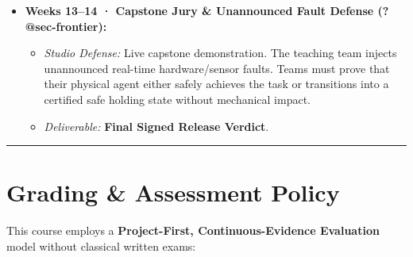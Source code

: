 \documentclass[
  9pt,
  letterpaper,
  open=right,
  numbers=noenddot,
  captions=tableheading]{scrbook}
\makeatletter
\providecommand{\tightlist}{%
  \setlength{\itemsep}{0pt}\setlength{\parskip}{0pt}}
\def\tightlist{}
\let\tightlist\relax
\newif\ifmlsys@inside@longtable
\newif\ifmlsys@longtable@numbered
\let\mlsys@orig@label\label
\renewcommand{\label}[1]{%
  \ifmlsys@inside@longtable
    \global\mlsys@longtable@numberedtrue
  \fi
  \mlsys@orig@label{#1}%
}
\let\label\mlsys@orig@label
\makeatother
\begin{document}
\begin{itemize}
  \begin{itemize}
  \tightlist
  \item
    \emph{Lecture:} Claim-Argument-Evidence (CAE) safety cases, Goal
    Structuring Notation (GSN), and UL 4600 / ISO standard alignment.
  \item
    \emph{Studio Lab (\texttt{99-design-review} prep):} Cryptographic
    artifact signing, safety case construction, release gate audit.
  \item
    \emph{Deliverable:} \textbf{Release Case}.
  \end{itemize}
\item
  \textbf{Weeks 13--14 · Capstone Jury \& Unannounced Fault Defense
  (\textbf{?@sec-frontier}):}

  \begin{itemize}
  \tightlist
  \item
    \emph{Studio Defense:} Live capstone demonstration. The teaching
    team injects unannounced real-time hardware/sensor faults. Teams
    must prove that their physical agent either safely achieves the task
    or transitions into a certified safe holding state without
    mechanical impact.
  \item
    \emph{Deliverable:} \textbf{Final Signed Release Verdict}.
  \end{itemize}
\end{itemize}

\begin{center}\rule{0.5\linewidth}{0.5pt}\end{center}

\section*{Grading \& Assessment Policy}\label{grading-assessment-policy}


This course employs a \textbf{Project-First, Continuous-Evidence
Evaluation} model without classical written exams:
\end{document}
